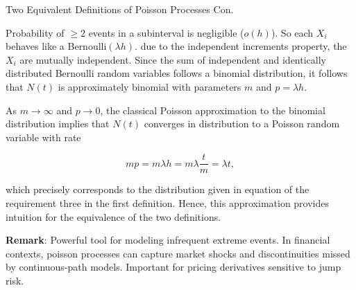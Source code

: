 \documentclass{beamer}
\begin{document}
\begin{frame}{Two Equivalent Definitions of Poisson Processes Con.}


    {\footnotesize \footnotesize
    \par Probability of $\geq 2$ events in a subinterval is negligible ($o(h)$). 
    So each $X_i$ behaves like a Bernoulli$(\lambda h)$. due to the independent increments property, the \( X_i \) are mutually independent. 
    Since the sum of independent and identically distributed Bernoulli random variables follows a binomial distribution, 
    it follows that \( N(t) \) is approximately binomial with parameters \( m \) and \( p = \lambda h \).
    \vspace{1em}
    \par As \( m \to \infty \) and \( p \to 0 \), the classical Poisson approximation to the binomial distribution implies
     that \( N(t) \) converges in distribution to a Poisson random variable with rate

        \[
        mp = m\lambda h = m\lambda \frac{t}{m} = \lambda t,
        \]
    \vspace{1em}
    \par  which precisely corresponds to the distribution given in equation of the requirement three in the first definition. 
    Hence, this approximation provides intuition for the equivalence of the two definitions.
    \vspace{1em}
    \par \textbf{Remark}: Powerful tool for modeling infrequent extreme events. In financial contexts, 
    poisson processes can capture market shocks and discontinuities missed by continuous-path models. Important for pricing derivatives sensitive to jump risk.

    }
\end{frame}




    
\end{document}
